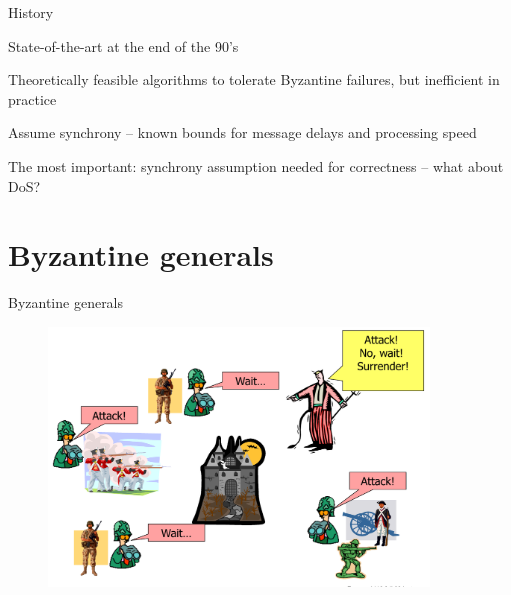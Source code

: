 \begin{frame}{History}

\BIL
\item State-of-the-art at the end of the 90's
\BI
\item Theoretically feasible algorithms to tolerate Byzantine failures, but inefficient in practice
\item Assume synchrony – known bounds for message delays and processing speed
\item The most important: synchrony assumption needed for correctness – what about DoS?
\EI
\EIL

\bigskip
\begin{Bib}
\end{Bib}

\end{frame}

\section{Byzantine generals}

\begin{frame}{Byzantine generals}
	
\begin{figure}
	\includegraphics[width=0.9\textwidth]{figs/14/generals}
\end{figure}

\end{frame}

